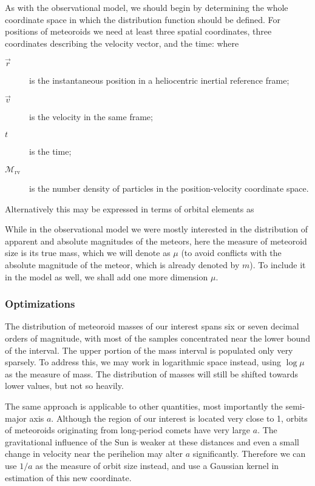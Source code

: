         As with the observational model, we should begin by determining the whole coordinate space
        in which the distribution function should be defined. For positions of meteoroids we need at least
        three spatial coordinates, three coordinates describing the velocity vector, and the time:
        where
        \begin{description}
            \item[$\vec{r}$]
                is the instantaneous position in a heliocentric inertial reference frame;
            \item[$\vec{v}$]
                is the velocity in the same frame;
            \item[$t$]
                is the time;
            \item[$\mathcal{M}_\mathrm{rv}$]
                is the number density of particles in the position-velocity coordinate space.
        \end{description}

        Alternatively this may be expressed in terms of orbital elements as

        While in the observational model we were mostly interested in the distribution of apparent and absolute
        magnitudes of the meteors, here the measure of meteoroid size is its true mass, which we will denote as
        $\mu$ (to avoid conflicts with the absolute magnitude of the meteor, which is already denoted by $m$).
        To include it in the model as well, we shall add one more dimension $\mu$.

        \subsubsection{Optimizations} \label{moco}
            The distribution of meteoroid masses of our interest spans six or seven decimal orders of magnitude,
            with most of the samples concentrated near the lower bound of the interval.
            The upper portion of the mass interval is populated only very sparsely.
            To address this, we may work in logarithmic space instead, using $\log \mu$ as the measure of mass.
            The distribution of masses will still be shifted towards lower values, but not so heavily.

            The same approach is applicable to other quantities, most importantly the semi-major axis $a$.
            Although the region of our interest is located very close to \SI{1}{\au},
            orbits of meteoroids originating from long-period comets have very large $a$.
            The gravitational influence of the Sun is weaker at these distances and
            even a small change in velocity near the perihelion may alter $a$ significantly.
            Therefore we can use $1/a$ as the measure of orbit size instead,
            and use a Gaussian kernel in estimation of this new coordinate.

